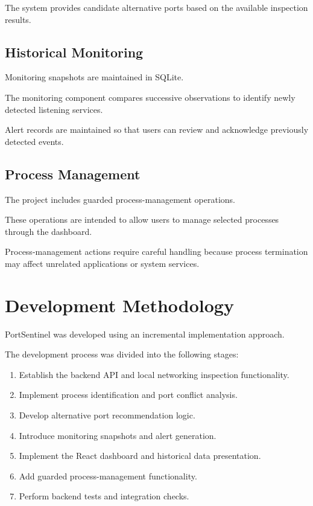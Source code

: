 \documentclass[conference]{IEEEtran}
\begin{document}
The system provides candidate alternative ports
based on the available inspection results.

\subsection{Historical Monitoring}

Monitoring snapshots are maintained in SQLite.

The monitoring component compares successive
observations to identify newly detected listening
services.

Alert records are maintained so that users can
review and acknowledge previously detected events.

\subsection{Process Management}

The project includes guarded process-management
operations.

These operations are intended to allow users to
manage selected processes through the dashboard.

Process-management actions require careful handling
because process termination may affect unrelated
applications or system services.

\section{Development Methodology}

PortSentinel was developed using an incremental
implementation approach.

The development process was divided into the
following stages:

\begin{enumerate}
    \item Establish the backend API and local
    networking inspection functionality.
    \item Implement process identification and
    port conflict analysis.
    \item Develop alternative port recommendation
    logic.
    \item Introduce monitoring snapshots and
    alert generation.
    \item Implement the React dashboard and
    historical data presentation.
    \item Add guarded process-management
    functionality.
    \item Perform backend tests and integration
    checks.
\end{enumerate}
\end{document}
